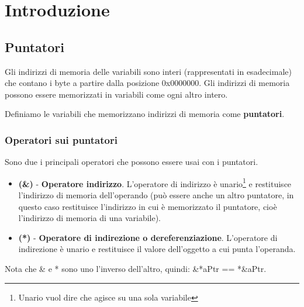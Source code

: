 \section{Introduzione}
\subsection{Puntatori}
Gli indirizzi di memoria delle variabili sono interi (rappresentati in esadecimale) che contano i byte a partire dalla posizione 0x0000000. Gli indirizzi di memoria possono essere memorizzati in variabili come ogni altro intero.
\begin{definition}[Puntatori]
Definiamo le variabili che memorizzano indirizzi di memoria come \textbf{puntatori}.
\end{definition}
\subsubsection{Operatori sui puntatori}
Sono due i principali operatori che possono essere usai con i puntatori.
\begin{itemize}
    \item \textbf{(\&)} \hspace{.1cm} - \hspace{.1cm} \textbf{Operatore indirizzo}. L'operatore di indirizzo è unario\footnote{Unario vuol dire che agisce su una sola variabile} e restituisce l'indirizzo di memoria dell'operando (può essere anche un altro puntatore, in questo caso restituisce l'indirizzo in cui è memorizzato il puntatore, cioè l'indirizzo di memoria di una variabile).
    \item \textbf{(*)} \hspace{.1cm} - \hspace{.1cm} \textbf{Operatore di indirezione o dereferenziazione}. L'operatore di indirezione è unario e restituisce il valore dell'oggetto a cui punta l'operanda. 
\end{itemize}

\begin{note}
Nota che \& e * sono uno l'inverso dell'altro, quindi: \&*aPtr == *\&aPtr.
\end{note}

